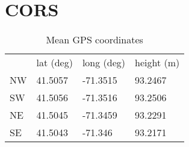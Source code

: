 \section{CORS}
\label{app:CORS}
\begin{table}[h]
\centering
\begin{tabular}{llll}
		  &lat (deg) & long (deg) & height (m) \\
NW        & 41.5057    & -71.3515   & 93.2467 \\
SW        & 41.5056    & -71.3516   & 93.2506 \\
NE        & 41.5045    & -71.3459   & 93.2291 \\
SE        & 41.5043    & -71.346    & 93.2171
\end{tabular}
\caption{Mean GPS coordinates}
\label{my-label}
\end{table}